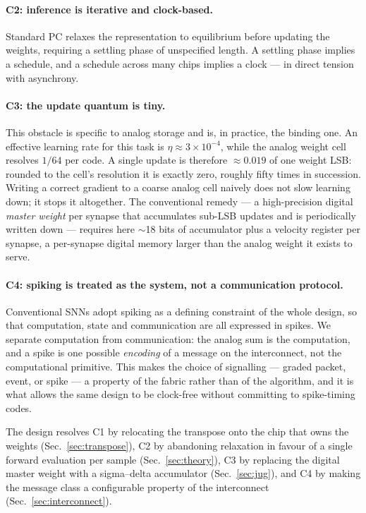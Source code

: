 \documentclass[11pt]{article}
\begin{document}
\paragraph{C2: inference is iterative and clock-based.} Standard PC relaxes the representation to
equilibrium before updating the weights, requiring a settling phase of unspecified length. A settling
phase implies a schedule, and a schedule across many chips implies a clock --- in direct tension with
asynchrony.

\paragraph{C3: the update quantum is tiny.} This obstacle is specific to analog storage and is, in
practice, the binding one. An effective learning rate for this task is $\eta \approx 3\times10^{-4}$,
while the analog weight cell resolves $1/64$ per code. A single update is therefore $\approx 0.019$ of
one weight LSB: rounded to the cell's resolution it is exactly zero, roughly fifty times in
succession. Writing a correct gradient to a coarse analog cell naively does not slow learning down; it
stops it altogether. The conventional remedy --- a high-precision digital \emph{master weight} per
synapse that accumulates sub-LSB updates and is periodically written down --- requires here $\sim$18
bits of accumulator plus a velocity register per synapse, a per-synapse digital memory larger than the
analog weight it exists to serve.

\paragraph{C4: spiking is treated as the system, not a communication protocol.} Conventional SNNs
adopt spiking as a defining constraint of the whole design, so that computation, state and
communication are all expressed in spikes. We separate computation from communication: the analog
sum is the computation, and a spike is one possible \emph{encoding} of a message on the interconnect,
not the computational primitive. This makes the choice of signalling --- graded packet, event, or
spike --- a property of the fabric rather than of the algorithm, and it is what allows the same design
to be clock-free without committing to spike-timing codes.

The design resolves C1 by relocating the transpose onto the chip that owns the weights
(Sec.~\ref{sec:transpose}), C2 by abandoning relaxation in favour of a single forward evaluation per
sample (Sec.~\ref{sec:theory}), C3 by replacing the digital master weight with a sigma--delta
accumulator (Sec.~\ref{sec:jug}), and C4 by making the message class a configurable property of the
interconnect (Sec.~\ref{sec:interconnect}).
\end{document}

